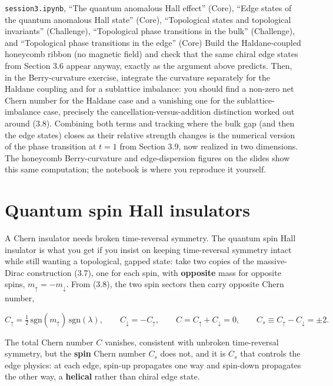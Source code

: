 

\begin{notebookbox}{\texttt{session3.ipynb}, ``The quantum anomalous Hall effect'' (Core), ``Edge states of the quantum anomalous Hall state'' (Core), ``Topological states and topological invariants'' (Challenge), ``Topological phase transitions in the bulk'' (Challenge), and ``Topological phase transitions in the edge'' (Core)}
Build the Haldane-coupled honeycomb ribbon (no magnetic field) and check that the same chiral edge
states from Section 3.6 appear anyway, exactly as the argument above predicts. Then, in the
Berry-curvature exercise, integrate the curvature separately for the Haldane coupling and for a
sublattice imbalance: you should find a non-zero net Chern number for the Haldane case and a
vanishing one for the sublattice-imbalance case, precisely the cancellation-versus-addition
distinction worked out around (3.8). Combining both terms and tracking where the bulk gap (and
then the edge states) closes as their relative strength changes is the numerical version of the
phase transition at $t=1$ from Section 3.9, now realized in two dimensions. The honeycomb
Berry-curvature and edge-dispersion figures on the slides show this same computation; the notebook
is where you reproduce it yourself.
\end{notebookbox}

\section{Quantum spin Hall insulators}

A Chern insulator needs broken time-reversal symmetry. The quantum spin Hall insulator is what you
get if you insist on keeping time-reversal symmetry intact while still wanting a topological, gapped
state: take two copies of the massive-Dirac construction (3.7), one for each spin, with \textbf{opposite}
mass for opposite spins, $m_\uparrow = -m_\downarrow$. From (3.8), the two spin sectors then carry
opposite Chern number,

\begin{equation}
C_\uparrow = \tfrac12\,\mathrm{sgn}(m_\uparrow)\,\mathrm{sgn}(\lambda), \qquad
C_\downarrow = -C_\uparrow, \qquad
C = C_\uparrow + C_\downarrow = 0, \qquad
C_s \equiv C_\uparrow - C_\downarrow = \pm 2.
\end{equation}

The total Chern number $C$ vanishes, consistent with unbroken time-reversal symmetry, but the \textbf{spin}
Chern number $C_s$ does not, and it is $C_s$ that controls the edge physics: at each edge, spin-up
propagates one way and spin-down propagates the other way, a \textbf{helical} rather than chiral edge
state.

